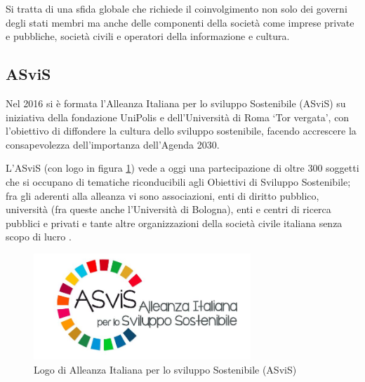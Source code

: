 Si tratta di una sfida globale che richiede il coinvolgimento non solo dei governi degli stati membri ma anche delle componenti della società come imprese private e pubbliche, società civili e operatori della informazione e cultura.

\subsection{ASviS}
Nel 2016 si è formata l'Alleanza Italiana per lo sviluppo Sostenibile (ASviS) \cite{asvis} su iniziativa della fondazione UniPolis e dell'Università di Roma \enquote*{Tor vergata}, con l'obiettivo di diffondere la cultura dello sviluppo sostenibile, facendo accrescere la consapevolezza dell'importanza dell'Agenda 2030.

L'ASviS (con logo in figura \ref{fig:asvis-logo}) vede a oggi una partecipazione di oltre 300 soggetti che si occupano di tematiche riconducibili agli Obiettivi di Sviluppo Sostenibile; fra gli aderenti alla alleanza vi sono associazioni, enti di diritto pubblico, università (fra queste anche l'Università di Bologna), enti e centri di ricerca pubblici e privati e tante altre organizzazioni della società civile italiana senza scopo di lucro \cite[Aderenti alla ASviS]{aderenti_asvis}. 

\begin{figure}[h]
    \center
    \includegraphics[height=4cm]{img/Logo-ASviS.jpg}
    \caption{Logo di Alleanza Italiana per lo sviluppo Sostenibile (ASviS)}
    \label{fig:asvis-logo}
\end{figure}
%
